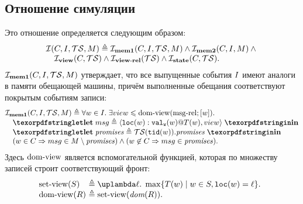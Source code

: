   \subsection{Отношение симуляции}%
  Это отношение определяется следующим образом:
  \[\inarr{
    \simRel(C, \IssuedSet, \TSf, M) \defeq \invMemOne(C, \IssuedSet, \TSf, M) \land  \invMemTwo(C, \IssuedSet, M) \land {} \\
    \quad \invView(C, \TSf) \land \invViewRel(\TSf) \land \invState(C, \TSf).
  }\]
  $\mathcal{I}_{\rm \bf mem1}(C, I, \mathcal{TS}, M)$ утверждает, что все выпущенные
  события $I$ имеют аналоги в памяти обещающей машины, причём выполненные обещания соответствуют покрытым
  событиям записи:
  \[\inarr{
  \invMemOne(C, \IssuedSet, \TSf, M) \defeq \forall w \in \IssuedSet. \; \exists \view \le \domView(\msgRel; [w]). \; \\
  \quad \letdef{msg}{\msg{\lLOC(w)}{\lVALW(w)}{T(w)}{\view}} \\
  \quad \letdef{\PromSet}{\TSf(\lTID(w)).\PromSet} \\
  \quad (w \in  C \implies msg \in M \setminus \PromSet) \land (w \nin C \implies msg \in \PromSet). \\
  }\]
  Здесь ${\rm dom\text{-}view}$ является вспомогательной функцией, которая по множеству записей строит соответствующий фронт:
  \[\begin{array}{@{}l@{~}l}
    \setView(S) & \defeq \lambda \loc. \; \max \{ T(w) \mid w \in S, \lLOC(w) = \loc\}. \\
    \domView(R) & \defeq \setView(\dom{R}). \\
  \end{array}\]
  
